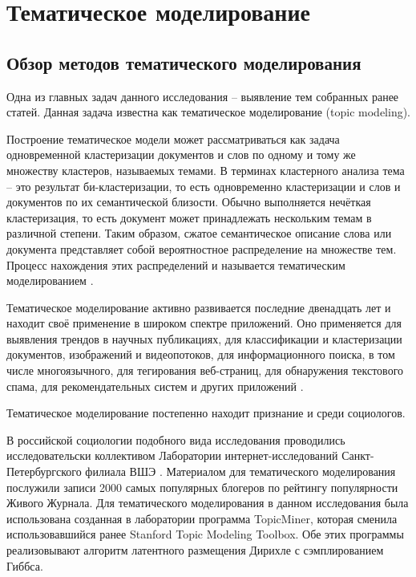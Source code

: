 \section{Тематическое моделирование}

\subsection{Обзор методов тематического моделирования}
Одна из главных задач данного исследования -- выявление тем собранных ранее статей. Данная задача известна как тематическое моделирование (topic modeling).

Построение тематическое модели может рассматриваться как задача одновременной кластеризации документов и слов по одному и тому же множеству кластеров, называемых темами. В терминах кластерного анализа тема -- это результат би-кластеризации, то есть одновременно кластеризации и слов и документов по их семантической близости. Обычно выполняется нечёткая кластеризация, то есть документ может принадлежать нескольким темам в различной степени. Таким образом, сжатое семантическое описание слова или документа представляет собой вероятностное распределение на множестве тем. Процесс нахождения этих распределений и называется тематическим моделированием \cite{korshunov2012}.

Тематическое моделирование активно развивается последние двенадцать лет и находит своё применение в широком спектре приложений. Оно применяется для выявления трендов в научных публикациях, для классификации и кластеризации документов, изображений и видеопотоков, для информационного поиска, в том числе многоязычного, для тегирования веб-страниц, для обнаружения текстового спама, для рекомендательных систем и других приложений \cite[стр. 4]{voroncov2013}. 

Тематическое моделирование постепенно находит признание и среди социологов. %

В российской социологии подобного вида исследования проводились исследовательски коллективом Лаборатории интернет-исследований Санкт-Петербургского филиала ВШЭ \cite{kolcovalda}. Материалом для тематического моделирования послужили записи 2000 самых популярных блогеров по рейтингу популярности Живого Журнала. Для тематического моделирования в данном исследования была использована созданная в лаборатории программа TopicMiner, которая сменила использовавшийся ранее Stanford Topic Modeling Toolbox. Обе этих программы реализовывают алгоритм латентного размещения Дирихле с сэмплированием Гиббса.

